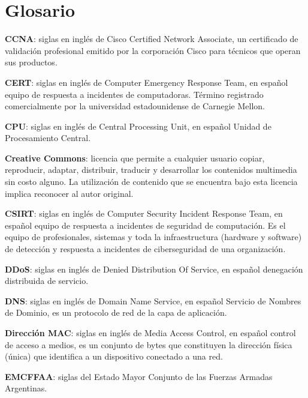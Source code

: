 \chapter*{\Large Glosario}

\textbf{CCNA}: siglas en inglés de Cisco Certified Network Associate, un certificado de validación profesional emitido por la corporación Cisco para técnicos que operan sus productos. \par

\textbf{CERT}: siglas en inglés de Computer Emergency Response Team, en español equipo de respuesta a incidentes de computadoras. Término registrado comercialmente por la universidad estadounidense de Carnegie Mellon. \par

\textbf{CPU}: siglas en inglés de Central Processing Unit, en español Unidad de Procesamiento Central.\par

\textbf{Creative Commons}: licencia que permite a cualquier usuario copiar, reproducir, adaptar, distribuir, traducir y desarrollar los contenidos multimedia sin costo alguno. La utilización de contenido que se encuentra bajo esta licencia implica reconocer al autor original.\par

\textbf{CSIRT}: siglas en inglés de Computer Security Incident Response Team, en español equipo de respuesta a incidentes de seguridad de computación. Es el equipo de profesionales, sistemas y toda la infraestructura (hardware y software) de detección y respuesta a incidentes de ciberseguridad de una organización.\par

\textbf{DDoS}: siglas en inglés de Denied Distribution Of Service, en español denegación distribuida de servicio. \par

\textbf{DNS}: siglas en inglés de Domain Name Service, en español Servicio de Nombres de Dominio, es un protocolo de red de la capa de aplicación. \par


\textbf{Dirección MAC}: siglas en inglés de Media Access Control, en español control de acceso a medios, es un conjunto de bytes que constituyen la dirección física (única) que identifica a un dispositivo conectado a una red. \par

\textbf{EMCFFAA}: siglas del Estado Mayor Conjunto de las Fuerzas Armadas Argentinas. \par

